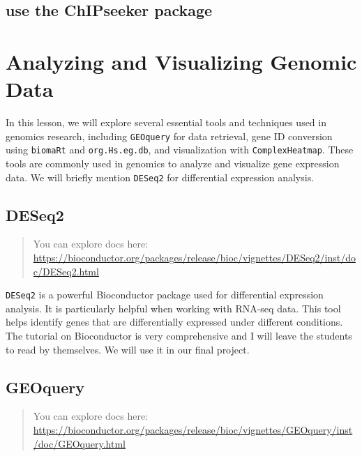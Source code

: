 \documentclass[
]{book}
\begin{document}
\hypertarget{use-the-chipseeker-package}{%
\subsection{use the ChIPseeker package}\label{use-the-chipseeker-package}}

\hypertarget{analyzing-and-visualizing-genomic-data}{%
\section{Analyzing and Visualizing Genomic Data}\label{analyzing-and-visualizing-genomic-data}}

In this lesson, we will explore several essential tools and techniques used in genomics research, including \texttt{GEOquery} for data retrieval, gene ID conversion using \texttt{biomaRt} and \texttt{org.Hs.eg.db}, and visualization with \texttt{ComplexHeatmap}. These tools are commonly used in genomics to analyze and visualize gene expression data. We will briefly mention \texttt{DESeq2} for differential expression analysis.

\hypertarget{deseq2}{%
\subsection{DESeq2}\label{deseq2}}

\begin{quote}
You can explore docs here: \url{https://bioconductor.org/packages/release/bioc/vignettes/DESeq2/inst/doc/DESeq2.html}
\end{quote}

\texttt{DESeq2} is a powerful Bioconductor package used for differential expression analysis. It is particularly helpful when working with RNA-seq data. This tool helps identify genes that are differentially expressed under different conditions. The tutorial on Bioconductor is very comprehensive and I will leave the students to read by themselves. We will use it in our final project.

\hypertarget{geoquery}{%
\subsection{GEOquery}\label{geoquery}}

\begin{quote}
You can explore docs here: \url{https://bioconductor.org/packages/release/bioc/vignettes/GEOquery/inst/doc/GEOquery.html}
\end{quote}
\end{document}
